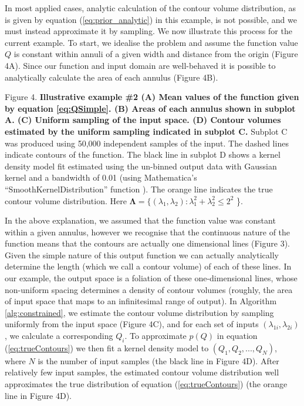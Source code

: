 \documentclass[10pt,letterpaper]{article}
\begin{document}

In most applied cases, analytic calculation of the contour volume distribution, as is given by equation (\ref{eq:prior_analytic}) in this example, is not possible, and we must instead approximate it by sampling. We now illustrate this process for the current example. To start, we idealise the problem and assume the function value $Q$ is constant within annuli of a given width and distance from the origin (Figure 4A). Since our function and input domain are well-behaved it is possible to analytically calculate the area of each annulus (Figure 4B).

\vspace{0.5cm}

Figure 4. \textbf{Illustrative example \#2 (A) Mean values of the function given by equation \eqref{eq:QSimple}. (B) Areas of each annulus shown in subplot A. (C) Uniform sampling of the input space. (D) Contour volumes estimated by the uniform sampling indicated in subplot C.} Subplot C was produced using 50,000 independent samples of the input. The dashed lines indicate contours of the function. The black line in subplot D shows a kernel density model fit estimated using the un-binned output data with Gaussian kernel and a bandwidth of 0.01 (using Mathematica's ``SmoothKernelDistribution'' function \cite{mathematica}). The orange line indicates the true contour volume distribution. Here $\boldsymbol{\Lambda} = \{ (\lambda_1,\lambda_2): \lambda_1^2+\lambda_2^2\leq2^2$ \}.

\vspace{0.5cm}

In the above explanation, we assumed that the function value was constant within a given annulus, however we recognise that the continuous nature of the function means that the contours are actually one dimensional lines (Figure 3). Given the simple nature of this output function we can actually analytically determine the length (which we call a contour volume) of each of these lines. In our example, the output space is a foliation of these one-dimensional lines, whose non-uniform spacing determines a density of contour volumes (roughly, the area of input space that maps to an infinitesimal range of output). In Algorithm \ref{alg:constrained}, we estimate the contour volume distribution by sampling uniformly from the input space (Figure 4C), and for each set of inputs $(\lambda_{1i},\lambda_{2i})$, we calculate a corresponding $Q_i$. To approximate $p(Q)$ in equation (\ref{eq:trueContours}) we then fit a kernel density model to $(Q_1,Q_2,...,Q_N)$, where $N$ is the number of input samples (the black line in Figure 4D). After relatively few input samples, the estimated contour volume distribution well approximates the true distribution of equation (\ref{eq:trueContours}) (the orange line in Figure 4D).
\end{document}
